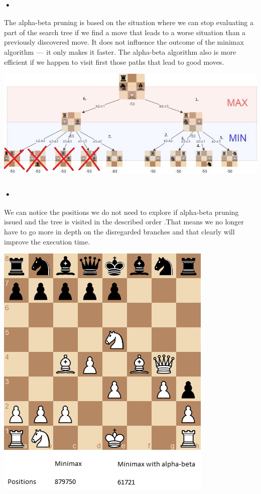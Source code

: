 \documentclass{svproc}
\begin{document}
\pagebreak

\subsubsection{•}
The alpha-beta pruning is based on the situation where we can stop evaluating a part of the search tree if we find a move that leads to a worse situation than a previously discovered move. It does not influence the outcome of the minimax algorithm  —  it only makes it faster. The alpha-beta algorithm also is more efficient if we happen to visit first those paths that lead to good moves.

\begin{center}
  \includegraphics[scale=0.4]{alpha-beta-pruning-1}
\end{center}

\subsubsection{•}
We can notice the positions we do not need to explore if alpha-beta pruning issued and the tree is visited in the described order .That means we no longer have to go more in depth on the disregarded branches and that clearly will improve the execution time.

\begin{center}
  \includegraphics[scale=0.6]{alpha-beta-pruning-2}
\end{center}
\end{document}
